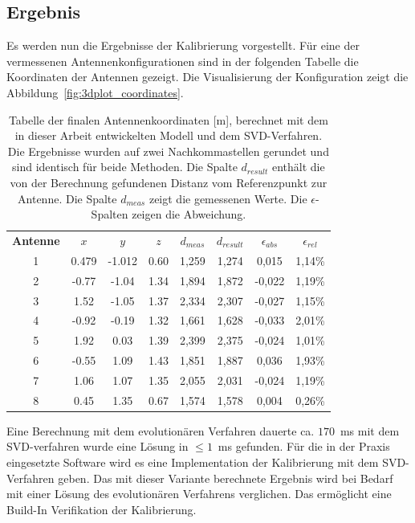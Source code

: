 \subsection{Ergebnis}
Es werden nun die Ergebnisse der Kalibrierung vorgestellt. Für eine der vermessenen Antennenkonfigurationen sind in der folgenden Tabelle die Koordinaten der Antennen gezeigt. Die Visualisierung der Konfiguration zeigt die Abbildung~\ref{fig:3dplot_coordinates}.
%
\begin{table} [ht!]
	\begin{center}
		\begin{tabular}{cccccccc}
		      \textbf{Antenne} & \textbf{$x$} & \textbf{$y$} & \textbf{$z$} & \textbf{$d_{meas}$} & \textbf{$d_{result}$}& \textbf{$\epsilon_{abs}$} & \textbf{$\epsilon_{rel}$} \\
		      1 & 0.479		& -1.012	& 0.60 & 1,259 & 1,274& 0,015 & 1,14\% \\
		      2 & -0.77 	& -1.04 	& 1.34 & 1,894 & 1,872 & -0,022 & 1,19\% \\
		      3 & 1.52  	& -1.05 	& 1.37 & 2,334 & 2,307 & -0,027 & 1,15\% \\
		      4 & -0.92 	& -0.19 	& 1.32 & 1,661 & 1,628 & -0,033 & 2,01\% \\
		      5 & 1.92 		&  0.03 	& 1.39 & 2,399 & 2,375 & -0,024 & 1,01\% \\
		      6 & -0.55 	&  1.09 	& 1.43 & 1,851 & 1,887 & 0,036 & 1,93\% \\
		      7 & 1.06 		&  1.07 	& 1.35 & 2,055 & 2,031 & -0,024 & 1,19\% \\
		      8 & 0.45 		&  1.35 	& 0.67 & 1,574 & 1,578 & 0,004 & 0,26\% \\					
%
		\end{tabular}
		\caption[Finale Antennen Koordinaten]{Tabelle der finalen Antennenkoordinaten [m], berechnet mit dem in dieser Arbeit entwickelten Modell und dem SVD-Verfahren. Die Ergebnisse wurden auf zwei Nachkommastellen gerundet und sind identisch für beide Methoden. Die Spalte $d_{result}$ enthält die von der Berechnung gefundenen Distanz vom Referenzpunkt zur Antenne. Die Spalte $d_{meas}$ zeigt die gemessenen Werte. Die $\epsilon$-Spalten zeigen die Abweichung.}
		\label{tab:FinalCoords}
	\end{center}
\end{table}
%
Eine Berechnung mit dem evolutionären Verfahren dauerte ca. $170$~ms mit dem SVD-verfahren wurde eine Lösung in $\le 1$~ms gefunden. Für die in der Praxis eingesetzte Software wird es eine Implementation der Kalibrierung mit dem SVD-Verfahren geben. Das mit dieser Variante berechnete Ergebnis wird bei Bedarf mit einer Lösung des evolutionären Verfahrens verglichen. Das ermöglicht eine Build-In Verifikation der Kalibrierung.\\

